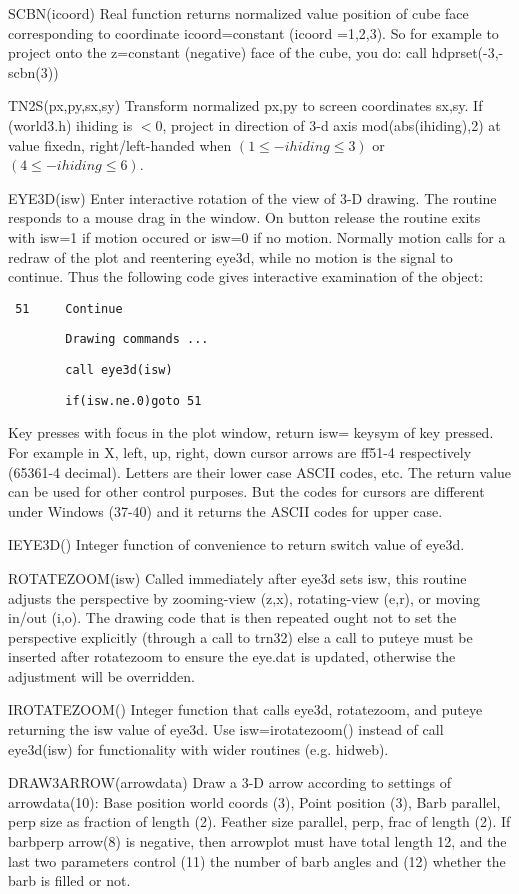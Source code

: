 \documentclass[12pt]{article}
\begin{document}
SCBN(icoord) Real function returns normalized value position of cube face
corresponding to coordinate icoord=constant (icoord =1,2,3). So for
example to project onto the z=constant (negative) face of the cube,
you do: call hdprset(-3,-scbn(3))

TN2S(px,py,sx,sy) Transform normalized px,py to screen coordinates
sx,sy. If (world3.h) ihiding is $<0$, project in direction of 3-d axis
mod(abs(ihiding),2) at value fixedn, right/left-handed when
$(1\le-ihiding\le3 )$ or $(4\le-ihiding\le 6)$.

EYE3D(isw) Enter interactive rotation of the view of 3-D drawing. The
routine responds to a mouse drag in the window. On button release the
routine exits with isw=1 if motion occured or isw=0 if no
motion. Normally motion calls for a redraw of the plot and reentering
eye3d, while no motion is the signal to continue. Thus the following
code gives interactive examination of the object:

\verb! 51     Continue!

\verb!        Drawing commands ...!

\verb!        call eye3d(isw)!

\verb!        if(isw.ne.0)goto 51!


Key presses with focus in the plot window, return isw= keysym of key
pressed. For example in X, left, up, right, down cursor arrows are
ff51-4 respectively (65361-4 decimal). Letters are their lower case
ASCII codes, etc.  The return value can be used for other control
purposes. But the codes for cursors are different under Windows
(37-40) and it returns the ASCII codes for upper case.
 
IEYE3D() Integer function of convenience to return switch value of eye3d.

ROTATEZOOM(isw) Called immediately after eye3d sets isw, this routine
adjusts the perspective by zooming-view (z,x), rotating-view (e,r), or
moving in/out (i,o). The drawing code that is then repeated ought not
to set the perspective explicitly (through a call to trn32) else a
call to puteye must be inserted after rotatezoom to ensure the eye.dat
is updated, otherwise the adjustment will be overridden.

IROTATEZOOM() Integer function that calls eye3d, rotatezoom, and
puteye returning the isw value of eye3d. Use isw=irotatezoom() instead
of call eye3d(isw) for functionality with wider routines (e.g. hidweb). 

DRAW3ARROW(arrowdata) Draw a 3-D arrow according to settings of
arrowdata(10): Base position world coords (3), Point position (3),
Barb parallel, perp size as fraction of length (2). 
Feather size parallel, perp, frac of length (2). If barbperp arrow(8)
is negative, then arrowplot must have total length 12, and the last
two parameters control (11) the number of barb angles and (12) whether the barb
is filled or not.
\end{document}
